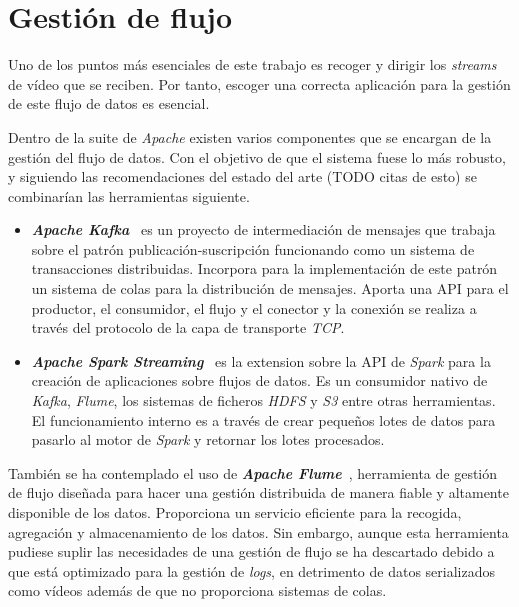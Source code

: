 
\section{Gestión de flujo}	

Uno de los puntos más esenciales de este trabajo es recoger y dirigir los \textit{streams} de vídeo que se reciben. Por tanto, escoger una correcta aplicación para la gestión de este flujo de datos es esencial.

Dentro de la suite de \textit{Apache} existen varios componentes que se encargan de la gestión del flujo de datos. Con el objetivo de que el sistema fuese lo más robusto, y siguiendo las recomendaciones del estado del arte (TODO citas de esto) se combinarían las herramientas siguiente.

\begin{itemize}
	\item \textit{\textbf{Apache Kafka}}~\cite{noauthorapachenodate} es un proyecto de intermediación de mensajes que trabaja sobre el patrón publicación-suscripción funcionando como un sistema de transacciones distribuidas. Incorpora para la implementación de este patrón un sistema de colas para la distribución de mensajes. Aporta una API para el productor, el consumidor, el flujo y el conector y la conexión se realiza a través del protocolo de la capa de transporte \textit{TCP}.  
	\item \textit{\textbf{Apache Spark Streaming}}~\cite{noauthorsparknodate} es la extension sobre la API de \textit{Spark} para la creación de aplicaciones sobre flujos de datos. Es un consumidor nativo de \textit{Kafka}, \textit{Flume}, los sistemas de ficheros \textit{HDFS} y \textit{S3} entre otras herramientas. El funcionamiento interno es a través de crear pequeños lotes de datos para pasarlo al motor de \textit{Spark} y retornar los lotes procesados.
\end{itemize}

También se ha contemplado el uso de \textit{\textbf{Apache Flume}}~\cite{noauthorapacheflume}, herramienta de gestión de flujo diseñada para hacer una gestión distribuida de manera fiable y altamente disponible de los datos. Proporciona un servicio eficiente para la recogida, agregación y almacenamiento de los datos. Sin embargo, aunque esta herramienta pudiese suplir las necesidades de una gestión de flujo se ha descartado debido a que está optimizado para la gestión de \textit{logs}, en detrimento de datos serializados como vídeos además de que no proporciona sistemas de colas.

